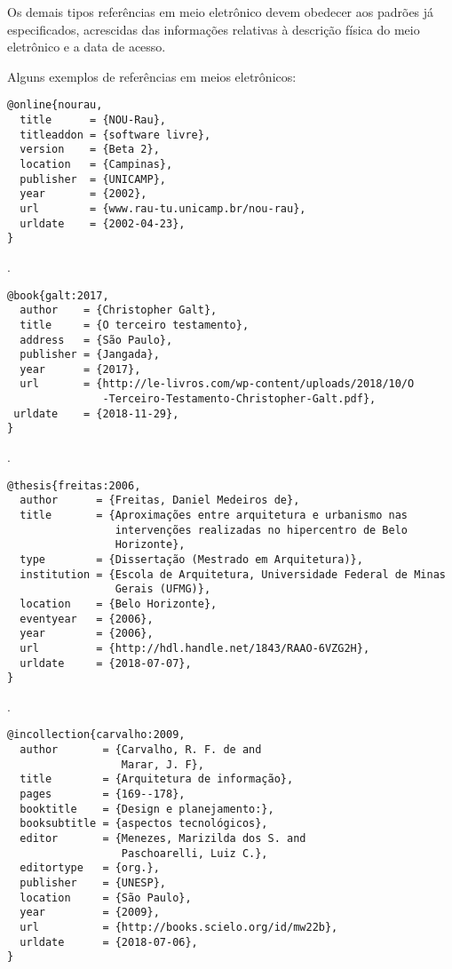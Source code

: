 Os demais tipos referências em meio eletrônico devem obedecer aos padrões já especificados, acrescidas das informações relativas à descrição física do meio eletrônico e a data de acesso.


Alguns exemplos de referências em meios eletrônicos:

\vspace*{1em}

\begin{verbatim}
@online{nourau,
  title      = {NOU-Rau},
  titleaddon = {software livre},
  version    = {Beta 2},
  location   = {Campinas},
  publisher  = {UNICAMP},
  year       = {2002},
  url        = {www.rau-tu.unicamp.br/nou-rau},
  urldate    = {2002-04-23},
}
\end{verbatim}

\noindent
{}.

\vspace*{1em}

\begin{verbatim}
@book{galt:2017,
  author    = {Christopher Galt},
  title     = {O terceiro testamento},
  address   = {São Paulo},
  publisher = {Jangada},
  year      = {2017},
  url       = {http://le-livros.com/wp-content/uploads/2018/10/O
               -Terceiro-Testamento-Christopher-Galt.pdf},
 urldate    = {2018-11-29},
}
\end{verbatim}

\noindent
{}.

\vspace*{1em}

\begin{verbatim}
@thesis{freitas:2006,
  author      = {Freitas, Daniel Medeiros de},
  title       = {Aproximações entre arquitetura e urbanismo nas
                 intervenções realizadas no hipercentro de Belo
                 Horizonte},
  type        = {Dissertação (Mestrado em Arquitetura)},
  institution = {Escola de Arquitetura, Universidade Federal de Minas
                 Gerais (UFMG)},
  location    = {Belo Horizonte},
  eventyear   = {2006},
  year        = {2006},
  url         = {http://hdl.handle.net/1843/RAAO-6VZG2H},
  urldate     = {2018-07-07},
}
\end{verbatim}

\noindent
{}.

\vspace*{1em}

\begin{verbatim}
@incollection{carvalho:2009,
  author       = {Carvalho, R. F. de and
                  Marar, J. F},
  title        = {Arquitetura de informação},
  pages        = {169--178},
  booktitle    = {Design e planejamento:},
  booksubtitle = {aspectos tecnológicos},
  editor       = {Menezes, Marizilda dos S. and
                  Paschoarelli, Luiz C.},
  editortype   = {org.},
  publisher    = {UNESP},
  location     = {São Paulo},
  year         = {2009},
  url          = {http://books.scielo.org/id/mw22b},
  urldate      = {2018-07-06},
}
\end{verbatim}

